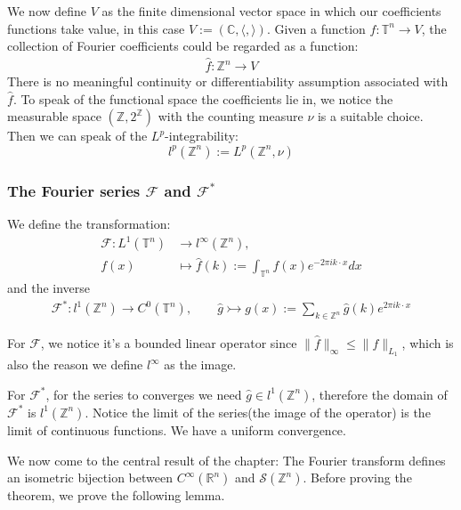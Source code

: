 \documentclass[a4paper,11pt,fleqn]{book}
\theoremstyle{definition}
\theoremstyle{remark}
\begin{document}
We now define $V$ as the finite dimensional vector space in which our coefficients functions take value, in this case $V:= ( \mathbb{C}, \langle , \rangle )$. 
Given a function $f : \mathbb{T}^n \rightarrow V$,  the collection of Fourier coefficients could be regarded as a function:
\begin{align*}
	\hat{f}: \mathbb{Z}^n \rightarrow V
\end{align*}
There is no meaningful continuity or differentiability assumption associated with $\hat{f}$. To speak of the functional space the coefficients lie in, we notice the measurable space $(\mathbb{Z}, 2^{\mathbb{Z}})$ with the counting measure $\nu$ is a suitable choice. Then we can speak of the $L^p$-integrability:
\begin{equation}
	l^p(\mathbb{Z}^n):= L^p(\mathbb{Z}^n, \nu)
\end{equation}



\subsubsection{The Fourier series $\mathcal{F}$ and $\mathcal{F}^*$}

We define the transformation:
\begin{align*}
	\mathcal{F}: L^1(\mathbb{T}^n) &\rightarrow l^\infty(\mathbb{Z}^n), \\
	f(x) &\mapsto \hat{f}(k) := \int_{\mathbb{T}^n} f(x) e^{-2 \pi i k \cdot x} dx
\end{align*}
and the inverse
\begin{align*}
	\mathcal{F}^* : l^1(\mathbb{Z}^n) \rightarrow C^0(\mathbb{T}^n),
	\qquad \hat{g} \rightarrowtail g(x):=  \sum_{ k \in \mathbb{Z}^n} \hat{g}(k) e^{2\pi i k \cdot x} 
\end{align*}

For $\mathcal{F}$, we notice it's a bounded linear operator since $\|\hat{f}\|_\infty \leq \|f\|_{L_1}$, which is also the reason we define $l^\infty$ as the image.\par 
For $\mathcal{F}^*$, for the series to converges we need $\hat{g} \in l^1(\mathbb{Z}^n)$, therefore the domain of $\mathcal{F}^*$ is $l^1(\mathbb{Z}^n)$. Notice the limit of the series(the image of the operator) is the limit of continuous functions. We have a uniform convergence. \par 
We now come to the central result of the chapter: The Fourier transform defines an isometric bijection between $C^\infty(\mathbb{R}^n)$ and $\mathcal{S}(\mathbb{Z}^n)$. Before proving the theorem, we prove the following lemma.
\end{document}
